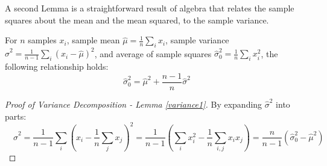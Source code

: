 A second Lemma is a straightforward result of algebra that relates the sample squares about the mean and the mean squared, to the sample variance.
\begin{lemma}\label{variance1}
For $n$ samples $x_i$, sample mean $\hat{\mu} = \frac{1}{n}\sum_ix_i$, sample variance $\hat{\sigma}^2=\frac{1}{n-1}\sum_i(x_i-\hat{\mu})^2$, and average of sample squares $\hat{\sigma}_0^2 = \frac{1}{n}\sum_ix_i^2$, the following relationship holds:
\[
\hat{\sigma}_0^2=\hat{\mu}^2+\frac{n-1}{n}\hat{\sigma}^2
\]
\end{lemma}
\begin{proof}[Proof of Variance Decomposition - Lemma \ref{variance1}]
By expanding $\hat{\sigma}^2$ into parts:\\
$$\quad\hat{\sigma}^2=\frac{1}{n-1}\sum_i\left(x_i-\frac{1}{n}\sum_jx_j \right)^2 
=\frac{1}{n-1}\left(\sum_ix_i^2-\frac{1}{n}\sum_{i,j}x_ix_j \right) = \frac{n}{n-1}\left(\hat{\sigma}_0^2-\hat{\mu}^2\right)$$
\end{proof}







